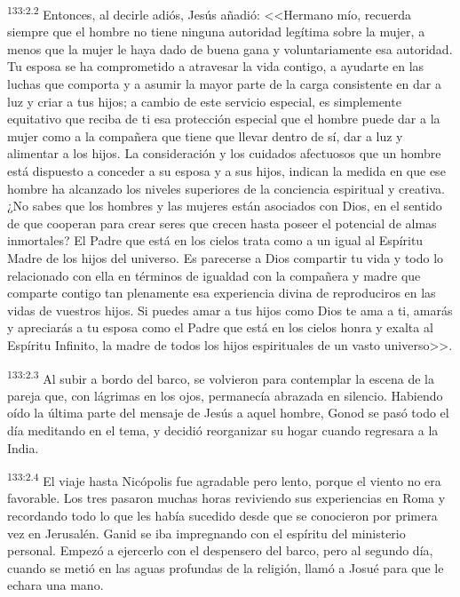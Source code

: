 \par 
\textsuperscript{133:2.2} Entonces, al decirle adiós, Jesús añadió: <<Hermano mío, recuerda siempre que el hombre no tiene ninguna autoridad legítima sobre la mujer, a menos que la mujer le haya dado de buena gana y voluntariamente esa autoridad. Tu esposa se ha comprometido a atravesar la vida contigo, a ayudarte en las luchas que comporta y a asumir la mayor parte de la carga consistente en dar a luz y criar a tus hijos; a cambio de este servicio especial, es simplemente equitativo que reciba de ti esa protección especial que el hombre puede dar a la mujer como a la compañera que tiene que llevar dentro de sí, dar a luz y alimentar a los hijos. La consideración y los cuidados afectuosos que un hombre está dispuesto a conceder a su esposa y a sus hijos, indican la medida en que ese hombre ha alcanzado los niveles superiores de la conciencia espiritual y creativa. ¿No sabes que los hombres y las mujeres están asociados con Dios, en el sentido de que cooperan para crear seres que crecen hasta poseer el potencial de almas inmortales? El Padre que está en los cielos trata como a un igual al Espíritu Madre de los hijos del universo. Es parecerse a Dios compartir tu vida y todo lo relacionado con ella en términos de igualdad con la compañera y madre que comparte contigo tan plenamente esa experiencia divina de reproduciros en las vidas de vuestros hijos. Si puedes amar a tus hijos como Dios te ama a ti, amarás y apreciarás a tu esposa como el Padre que está en los cielos honra y exalta al Espíritu Infinito, la madre de todos los hijos espirituales de un vasto universo>>.

\par 
\textsuperscript{133:2.3} Al subir a bordo del barco, se volvieron para contemplar la escena de la pareja que, con lágrimas en los ojos, permanecía abrazada en silencio. Habiendo oído la última parte del mensaje de Jesús a aquel hombre, Gonod se pasó todo el día meditando en el tema, y decidió reorganizar su hogar cuando regresara a la India.

\par 
\textsuperscript{133:2.4} El viaje hasta Nicópolis fue agradable pero lento, porque el viento no era favorable. Los tres pasaron muchas horas reviviendo sus experiencias en Roma y recordando todo lo que les había sucedido desde que se conocieron por primera vez en Jerusalén. Ganid se iba impregnando con el espíritu del ministerio personal. Empezó a ejercerlo con el despensero del barco, pero al segundo día, cuando se metió en las aguas profundas de la religión, llamó a Josué para que le echara una mano.

